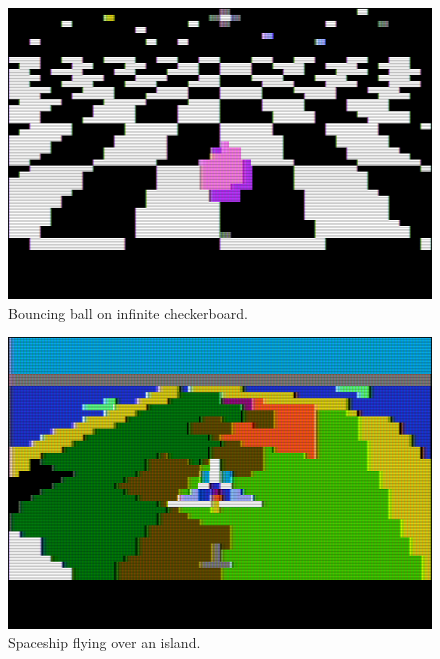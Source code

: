 \documentclass[twocolumn]{article}
\begin{document}
\begin{figure}[tb]
\begin{center}
\includegraphics[width=\columnwidth]{figures/m7_screen1.png}
\caption{Bouncing ball on infinite checkerboard.\label{fig:ball}}
\end{center}
\end{figure}

\begin{figure}[tb]
\begin{center}
\includegraphics[width=\columnwidth]{figures/m7_screen4.png}
\caption{Spaceship flying over an island.\label{fig:tb1}}
\end{center}
\end{figure}
\end{document}
